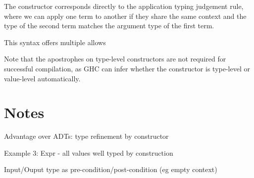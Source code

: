The  constructor corresponds directly to the application typing judgement rule, where we can apply one term to another if they share the same context  and the type of the second term matches the argument type  of the first term.

This syntax offers multiple allows 


Note that the apostrophes on type-level constructors are not required for successful compilation, as GHC can infer whether the constructor is type-level or value-level automatically. 

\section{Notes}

Advantage over ADTs: type refinement by constructor

Example 3: Expr - all values well typed by construction

Input/Ouput type as pre-condition/post-condition (eg empty context)
